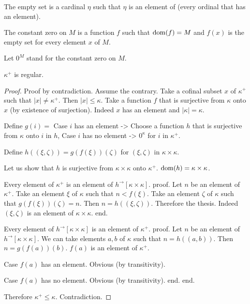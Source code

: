 \documentclass{article}
\newcommand{\Prod}[2]{#1\times #2}
\newcommand{\Succ}[1]{#1^{+}}
\newcommand{\image}[2]{#1^{\to}[#2]}
\newcommand{\card}[1]{\left|#1\right|}
\begin{document}
\begin{forthel}
    \begin{definition}
      The empty set is a cardinal $\eta$ such that $\eta$
      is an element of (every ordinal that has an element).
    \end{definition}

    \begin{definition}
      The constant zero on $M$ is a function $f$ such that $\operatorname{dom}(f) = M$ and $f(x)$ is the empty set for every element $x$ of $M$.
    \end{definition}

    Let $0^M$ stand for the constant zero on $M$.

    \begin{theorem}
      $\Succ{\kappa}$ is regular.
    \end{theorem}
    \begin{proof}
      Proof by contradiction. Assume the contrary.
      Take a cofinal subset $x$ of $\Succ{\kappa}$ such that $\card{x} \neq \Succ{\kappa}$.
      Then $\card{x} \leq \kappa$.
      Take a function $f$ that is surjective from $\kappa$ onto $x$ (by existence of surjection).
      Indeed $x$ has an element and $\card{\kappa} = \kappa$.

      Define $g(i) =$
        Case $i$ has an element -> Choose a function $h$ that is surjective from $\kappa$ onto $i$ in $h$,
        Case $i$ has no element -> $0^\kappa$
      for $i$ in $\Succ{\kappa}$.

      Define $h((\xi,\zeta)) = g(f(\xi))(\zeta)$ for $(\xi,\zeta)$ in $\Prod{\kappa}{\kappa}$.

      Let us show that $h$ is surjective from $\Prod{\kappa}{\kappa}$ onto $\Succ{\kappa}$.
      $\dom(h) = \Prod{\kappa}{\kappa}$.

        Every element of $\Succ{\kappa}$ is an element of $\image{h}{\Prod{\kappa}{\kappa}}$.
        proof.
          Let $n$ be an element of $\Succ{\kappa}$.
          Take an element $\xi$ of $\kappa$ such that $n < f(\xi)$.
          Take an element $\zeta$ of $\kappa$ such that $g(f(\xi))(\zeta) = n$.
          Then $n = h((\xi,\zeta))$.
          Therefore the thesis.
          Indeed $(\xi,\zeta)$ is an element of $\Prod{\kappa}{\kappa}$.
        end.

        Every element of $\image{h}{\Prod{\kappa}{\kappa}}$ is an element of $\Succ{\kappa}$.
        proof.
          Let $n$ be an element of $\image{h}{\Prod{\kappa}{\kappa}}$.
          We can take elements $a,b$ of $\kappa$ such that $n = h((a,b))$.
          Then $n = g(f(a))(b)$. $f(a)$ is an element of $\Succ{\kappa}$.

          Case $f(a)$ has an element. Obvious (by transitivity).

          Case $f(a)$ has no element. Obvious (by transitivity).
        end.
      end.

      Therefore $\Succ{\kappa} \leq \kappa$. Contradiction.
    \end{proof}
  \end{forthel}
\end{document}
